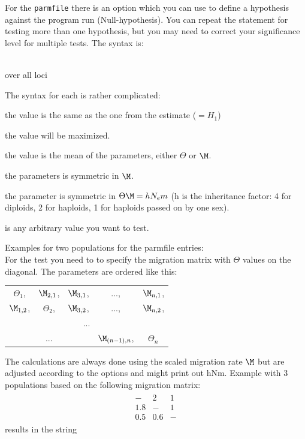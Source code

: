 For the {\tt parmfile} there is an option {} which you can use to 
define a hypothesis against the program run (Null-hypothesis). 
You can repeat the statement for testing more than one hypothesis,
but you may need to correct your significance level for multiple tests. 
The syntax is:\\
{}\\
\begin{description}
\item{} over all loci
\end{description}
The syntax for each {} is rather complicated:
{}\\
\begin{description}
\item{\bt{*}} the value is the same as the one from the estimate ($=H_1$)
\item{} the value will be maximized.
\item{} the value is the mean of the parameters, either $\Theta$ or $\M$.
\item{} the parameters is symmetric in $\M$.
\item{} the parameter is symmetric in $\Theta\M= hN_em$ (h is the inheritance factor: 4 for diploids, 2 for haploids, 1 for haploids passed on by one sex).
\item{} is any arbitrary value you want to test.
\end{description}
Examples for two populations for the parmfile entries:\\
{}
\smallskip%
For the test you need to to specify the migration matrix with $\Theta$ values on the diagonal.
The parameters are ordered like this:\\
\begin{tabular}{ccccc}
$\Theta_1$, & $\M_{2,1}$,& $\M_{3,1}$,& ...,& $\M_{n,1}$,\\
$\M_{1,2}$,& $\Theta_2$,&  $\M_{3,2}$,& ...,& $\M_{n,2}$, \\
\multicolumn{5}{c}{...}\\
\multicolumn{3}{c}{...}& $\M_{(n-1),n}$,& $\Theta_n$
\end{tabular}

The calculations are always done using the scaled migration rate $\M$ but are adjusted according to the options and might print out hNm.\medskip
Example with 3 populations based on the following migration matrix:
\begin{gather}
\begin{matrix}
- &2&1\\
1.8&-&1\\
0.5&0.6&-
\end{matrix} \nonumber
\end{gather}
results in the string\\
{}

